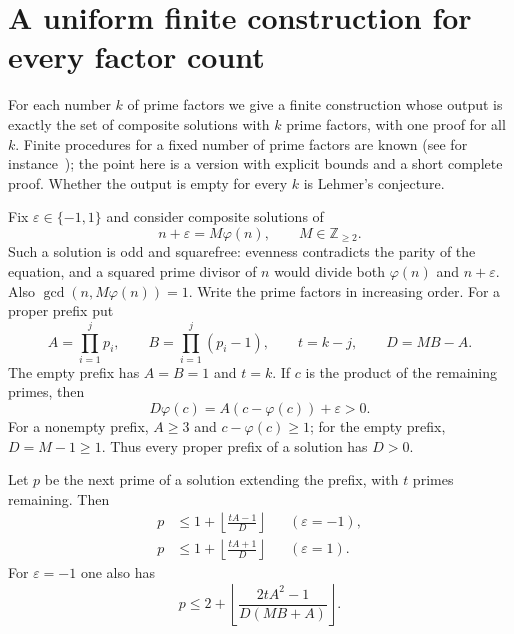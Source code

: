 \section{A uniform finite construction for every factor count}
\label{app:uniformallk}

For each number $k$ of prime factors we give a finite construction
whose output is exactly the set of composite solutions with $k$ prime
factors, with one proof for all $k$. Finite procedures for a fixed
number of prime factors are known (see for instance~\cite{MS26}); the
point here is a version with explicit bounds and a short complete
proof. Whether the output is empty for every $k$ is Lehmer's
conjecture.

Fix $\varepsilon\in\{-1,1\}$ and consider composite solutions of
\begin{equation}\label{eq:uniformtarget}
 n+\varepsilon=M\varphi(n),\qquad M\in\mathbb Z_{\ge2}.
\end{equation}
Such a solution is odd and squarefree: evenness contradicts the parity of
the equation, and a squared prime divisor of $n$ would divide both
$\varphi(n)$ and $n+\varepsilon$. Also $\gcd(n,M\varphi(n))=1$.
Write the prime factors in increasing order. For a proper prefix put
\[
 A=\prod_{i=1}^{j}p_i,\qquad B=\prod_{i=1}^{j}(p_i-1),\qquad
 t=k-j,\qquad D=MB-A.
\]
The empty prefix has $A=B=1$ and $t=k$. If $c$ is the product of the
remaining primes, then
\begin{equation}\label{eq:uniformdefectpositive}
 D\varphi(c)=A(c-\varphi(c))+\varepsilon>0.
\end{equation}
For a nonempty prefix, $A\ge3$ and $c-\varphi(c)\ge1$; for the empty
prefix, $D=M-1\ge1$. Thus every proper prefix of a solution has $D>0$.

\begin{lemma}\label{lem:uniformnext}
Let $p$ be the next prime of a solution extending the prefix, with $t$
primes remaining. Then
\begin{align}
 p&\le 1+\left\lfloor\frac{tA-1}{D}\right\rfloor
       &&(\varepsilon=-1),\label{eq:uniformlinearminus}\\
 p&\le 1+\left\lfloor\frac{tA+1}{D}\right\rfloor
       &&(\varepsilon=1).\label{eq:uniformlinearplus}
\end{align}
For $\varepsilon=-1$ one also has
\begin{equation}\label{eq:uniformoddcutoff}
 p\le2+\left\lfloor
 \frac{2tA^2-1}{D(MB+A)}\right\rfloor.
\end{equation}
\end{lemma}

